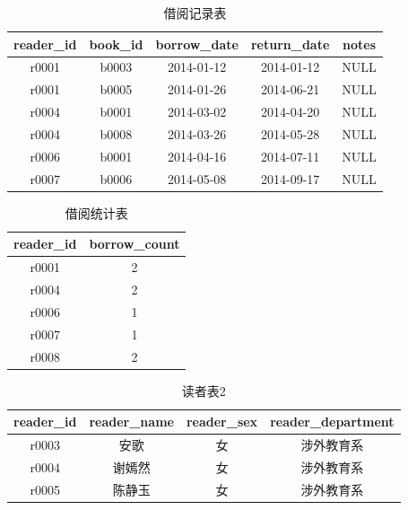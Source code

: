 \documentclass[a4paper]{article}
\begin{document}
\begin{table}[H]
\centering
\caption{借阅记录表}
\label{tab:record}
\begin{tabular}{|c|c|c|c|c|}
\hline
\textbf{reader\_id} & \textbf{book\_id} & \textbf{borrow\_date} & \textbf{return\_date} & \textbf{notes} \\
\hline
r0001 & b0003 & 2014-01-12 & 2014-01-12 & NULL \\
\hline
r0001 & b0005 & 2014-01-26 & 2014-06-21 & NULL \\
\hline
r0004 & b0001 & 2014-03-02 & 2014-04-20 & NULL \\
\hline
r0004 & b0008 & 2014-03-26 & 2014-05-28 & NULL \\
\hline
r0006 & b0001 & 2014-04-16 & 2014-07-11 & NULL \\
\hline
r0007 & b0006 & 2014-05-08 & 2014-09-17 & NULL \\
\hline
\end{tabular}
\end{table}

\begin{table}[H]
\centering
\caption{借阅统计表}
\label{tab:borrow_statistics}
\begin{tabular}{|c|c|}
\hline
\textbf{reader\_id} & \textbf{borrow\_count} \\
\hline
r0001 & 2 \\
\hline
r0004 & 2 \\
\hline
r0006 & 1 \\
\hline
r0007 & 1 \\
\hline
r0008 & 2 \\
\hline
\end{tabular}
\end{table}

\begin{table}[H]
\centering
\caption{读者表2}
\label{tab:reader2}
\begin{tabular}{|c|c|c|c|}
\hline
\textbf{reader\_id} & \textbf{reader\_name} & \textbf{reader\_sex} & \textbf{reader\_department} \\
\hline
r0003 & 安歌 & 女 & 涉外教育系 \\
\hline
r0004 & 谢嫣然 & 女 & 涉外教育系 \\
\hline
r0005 & 陈静玉 & 女 & 涉外教育系 \\
\hline
\end{tabular}
\end{table}
\end{document}
